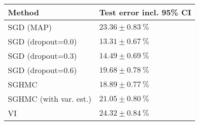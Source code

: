 \begin{tabular}{ll}
\toprule
                Method & Test error incl. 95\% CI \\
\midrule
             SGD (MAP) &      $23.36 \pm 0.83~\%$ \\
     SGD (dropout=0.0) &      $13.31 \pm 0.67~\%$ \\
     SGD (dropout=0.3) &      $14.49 \pm 0.69~\%$ \\
     SGD (dropout=0.6) &      $19.68 \pm 0.78~\%$ \\
                 SGHMC &      $18.89 \pm 0.77~\%$ \\
SGHMC (with var. est.) &      $21.05 \pm 0.80~\%$ \\
                    VI &      $24.32 \pm 0.84~\%$ \\
\bottomrule
\end{tabular}
